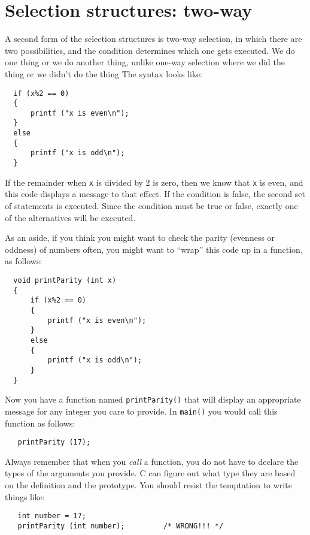 \section {Selection structures: two-way}
\label{alternative}

A second form of the selection structures is two-way selection, 
in which there are two possibilities, and the condition determines
which one gets executed.  We do one thing or we do another thing, 
unlike one-way selection where we did the thing or we didn't do the thing
 The syntax looks like:

\begin{verbatim}
  if (x%2 == 0)
  {
      printf ("x is even\n");
  } 
  else 
  {
      printf ("x is odd\n");
  }
\end{verbatim}
%
If the remainder when {\tt x} is divided by 2 is zero, then
we know that {\tt x} is even, and this code displays a message
to that effect.  If the condition is false, the second
set of statements is executed.  Since the condition must
be true or false, exactly one of the alternatives will be
executed.

As an aside, if you think you might want to check the parity
(evenness or oddness) of numbers often, you might want to
``wrap'' this code up in a function, as follows:

\begin{verbatim}
  void printParity (int x) 
  {
      if (x%2 == 0) 
      {
          printf ("x is even\n");
      } 
      else 
      {
          printf ("x is odd\n");
      }
  }
\end{verbatim}
%
Now you have a function named {\tt printParity()} that will display
an appropriate message for any integer you care to provide.
In {\tt main()} you would call this function as follows:

\begin{verbatim}
   printParity (17);
\end{verbatim}
%
Always remember that when you {\em call} a function, you do
not have to declare the types of the arguments you provide.
C can figure out what type they are based on the definition and the prototype.
You should resist the temptation to write things like:

\begin{verbatim}
   int number = 17;
   printParity (int number);         /* WRONG!!! */
\end{verbatim}

